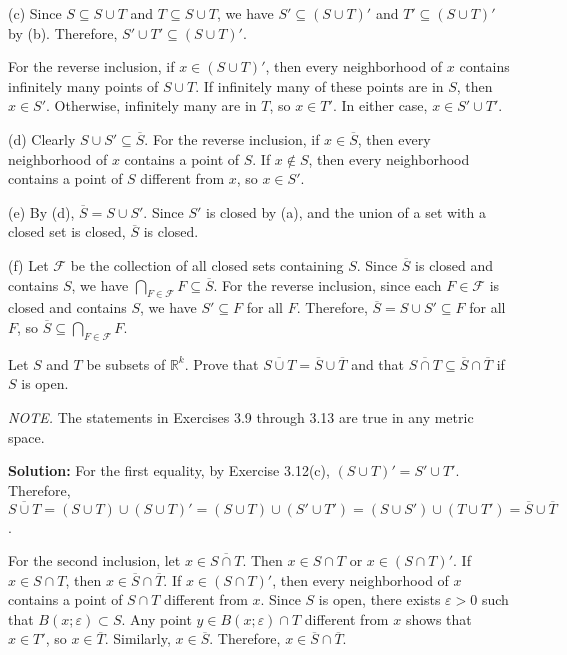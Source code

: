 (c) Since $S \subseteq S \cup T$ and $T \subseteq S \cup T$, we have $S' \subseteq (S \cup T)'$ and $T' \subseteq (S \cup T)'$ by (b). Therefore, $S' \cup T' \subseteq (S \cup T)'$.

For the reverse inclusion, if $x \in (S \cup T)'$, then every neighborhood of $x$ contains infinitely many points of $S \cup T$. If infinitely many of these points are in $S$, then $x \in S'$. Otherwise, infinitely many are in $T$, so $x \in T'$. In either case, $x \in S' \cup T'$.

(d) Clearly $S \cup S' \subseteq \overline{S}$. For the reverse inclusion, if $x \in \overline{S}$, then every neighborhood of $x$ contains a point of $S$. If $x \notin S$, then every neighborhood contains a point of $S$ different from $x$, so $x \in S'$.

(e) By (d), $\overline{S} = S \cup S'$. Since $S'$ is closed by (a), and the union of a set with a closed set is closed, $\overline{S}$ is closed.

(f) Let $\mathcal{F}$ be the collection of all closed sets containing $S$. Since $\overline{S}$ is closed and contains $S$, we have $\bigcap_{F \in \mathcal{F}} F \subseteq \overline{S}$. For the reverse inclusion, since each $F \in \mathcal{F}$ is closed and contains $S$, we have $S' \subseteq F$ for all $F$. Therefore, $\overline{S} = S \cup S' \subseteq F$ for all $F$, so $\overline{S} \subseteq \bigcap_{F \in \mathcal{F}} F$.

\begin{problembox}

Let $S$ and $T$ be subsets of $\mathbb{R}^k$. Prove that $\overline{S \cup T} = \overline{S} \cup \overline{T}$ and that $\overline{S \cap T} \subseteq \overline{S} \cap \overline{T}$ if $S$ is open.

\textit{NOTE.} The statements in Exercises 3.9 through 3.13 are true in any metric space.
\end{problembox}

\textbf{Solution:} For the first equality, by Exercise 3.12(c), $(S \cup T)' = S' \cup T'$. Therefore, $\overline{S \cup T} = (S \cup T) \cup (S \cup T)' = (S \cup T) \cup (S' \cup T') = (S \cup S') \cup (T \cup T') = \overline{S} \cup \overline{T}$.

For the second inclusion, let $x \in \overline{S \cap T}$. Then $x \in S \cap T$ or $x \in (S \cap T)'$. If $x \in S \cap T$, then $x \in \overline{S} \cap \overline{T}$. If $x \in (S \cap T)'$, then every neighborhood of $x$ contains a point of $S \cap T$ different from $x$. Since $S$ is open, there exists $\varepsilon > 0$ such that $B(x;\varepsilon) \subset S$. Any point $y \in B(x;\varepsilon) \cap T$ different from $x$ shows that $x \in T'$, so $x \in \overline{T}$. Similarly, $x \in \overline{S}$. Therefore, $x \in \overline{S} \cap \overline{T}$.


